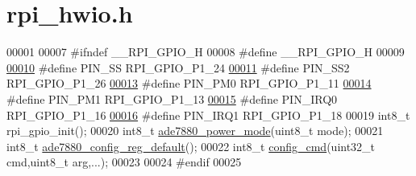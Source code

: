 \hypertarget{a00039}{\section{rpi\-\_\-hwio.\-h}
\label{d3/de7/a00039}
}

\begin{DoxyCode}
00001 
00007 \textcolor{preprocessor}{#ifndef \_\_RPI\_GPIO\_H}
00008 \textcolor{preprocessor}{}\textcolor{preprocessor}{#define \_\_RPI\_GPIO\_H}
00009 \textcolor{preprocessor}{}
\hypertarget{a00039_source_l00010}{}\hyperlink{a00039_ab4b553591a495409d4f7cec4b6c3e754}{00010} \textcolor{preprocessor}{  #define PIN\_SS   RPI\_GPIO\_P1\_24       }
\hypertarget{a00039_source_l00011}{}\hyperlink{a00039_a8aa8d44cb9d876a244263493e0a2a7c5}{00011} \textcolor{preprocessor}{  #define PIN\_SS2  RPI\_GPIO\_P1\_26       }
\hypertarget{a00039_source_l00013}{}\hyperlink{a00039_aef7884a448449013ba1f8b46b8df5c05}{00013} \textcolor{preprocessor}{  #define PIN\_PM0  RPI\_GPIO\_P1\_11       }
\hypertarget{a00039_source_l00014}{}\hyperlink{a00039_a93e6f13f663a3ca8bcf6efe2022c9b78}{00014} \textcolor{preprocessor}{  #define PIN\_PM1  RPI\_GPIO\_P1\_13       }
\hypertarget{a00039_source_l00015}{}\hyperlink{a00039_a99ed780c4dd8d2e01c5ff66064306abf}{00015} \textcolor{preprocessor}{  #define PIN\_IRQ0 RPI\_GPIO\_P1\_16       }
\hypertarget{a00039_source_l00016}{}\hyperlink{a00039_a14204df3192ece77fc1b651c6625bc30}{00016} \textcolor{preprocessor}{  #define PIN\_IRQ1 RPI\_GPIO\_P1\_18       }
00019 \textcolor{preprocessor}{  int8\_t  rpi\_gpio\_init();}
00020 \textcolor{preprocessor}{}  int8\_t  \hyperlink{a00005_gae9a5abd4e5054e7ea3f149b1764f2cd0}{ade7880\_power\_mode}(uint8\_t mode);
00021   int8\_t  \hyperlink{a00005_ga7782772c18e6ea515dcd28dcaedd0f06}{ade7880\_config\_reg\_default}();
00022   int8\_t  \hyperlink{a00005_ga369ee0e8379941cbc2c79b90ec3292da}{config\_cmd}(uint32\_t cmd,uint8\_t arg,...);
00023 
00024 \textcolor{preprocessor}{#endif}
00025 \textcolor{preprocessor}{}
\end{DoxyCode}

